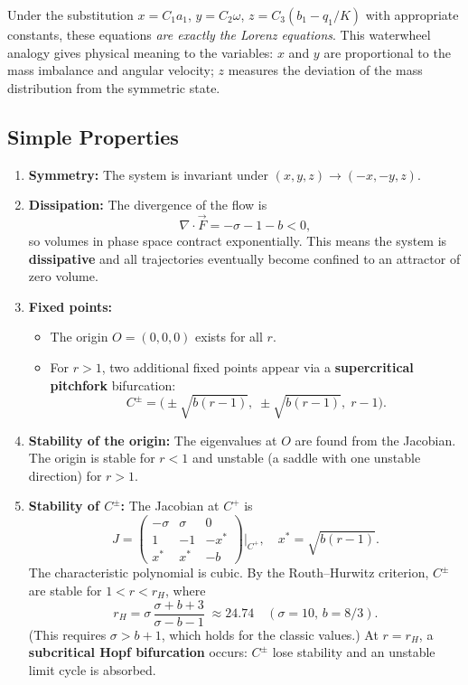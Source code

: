\documentclass[11pt,letterpaper]{article}
\theoremstyle{definition}
\theoremstyle{plain}
\theoremstyle{remark}
\begin{document}
Under the substitution
$x = C_1 a_1$, $y = C_2 \omega$, $z = C_3(b_1 - q_1/K)$ with
appropriate constants, these equations \emph{are exactly the Lorenz
equations}.  This waterwheel analogy gives physical meaning to the
variables: $x$ and $y$ are proportional to the mass imbalance and
angular velocity; $z$ measures the deviation of the mass distribution
from the symmetric state.

\subsection{Simple Properties}

\begin{enumerate}[leftmargin=2em]
\item \textbf{Symmetry:}  The system is invariant under
      $(x,y,z)\to(-x,-y,z)$.

\item \textbf{Dissipation:}  The divergence of the flow is
      \[
        \nabla\cdot\vec{F} = -\sigma - 1 - b < 0,
      \]
      so volumes in phase space contract exponentially.  This means the
      system is \textbf{dissipative} and all trajectories eventually
      become confined to an attractor of zero volume.

\item \textbf{Fixed points:}
      \begin{itemize}
      \item The origin $O = (0,0,0)$ exists for all $r$.
      \item For $r > 1$, two additional fixed points appear via a
            \textbf{supercritical pitchfork} bifurcation:
            \[
              C^\pm = \bigl(\pm\sqrt{b(r-1)},\;\pm\sqrt{b(r-1)},\;r-1\bigr).
            \]
      \end{itemize}

\item \textbf{Stability of the origin:}  The eigenvalues at $O$ are found
      from the Jacobian.  The origin is stable for $r<1$ and unstable (a
      saddle with one unstable direction) for $r>1$.

\item \textbf{Stability of $C^\pm$:}  The Jacobian at $C^+$ is
      \[
        J = \begin{pmatrix} -\sigma & \sigma & 0 \\
        1 & -1 & -x^* \\ x^* & x^* & -b \end{pmatrix}
        \bigg|_{C^+}, \quad x^* = \sqrt{b(r-1)}.
      \]
      The characteristic polynomial is cubic.  By the Routh--Hurwitz
      criterion, $C^\pm$ are stable for $1 < r < r_H$, where
      \begin{equation}
        r_H = \sigma\,\frac{\sigma + b + 3}{\sigma - b - 1}
        \;\approx 24.74 \quad (\sigma=10,\,b=8/3).
      \end{equation}
      (This requires $\sigma > b+1$, which holds for the classic values.)
      At $r=r_H$, a \textbf{subcritical Hopf bifurcation} occurs:
      $C^\pm$ lose stability and an unstable limit cycle is absorbed.


\end{enumerate}
\end{document}

